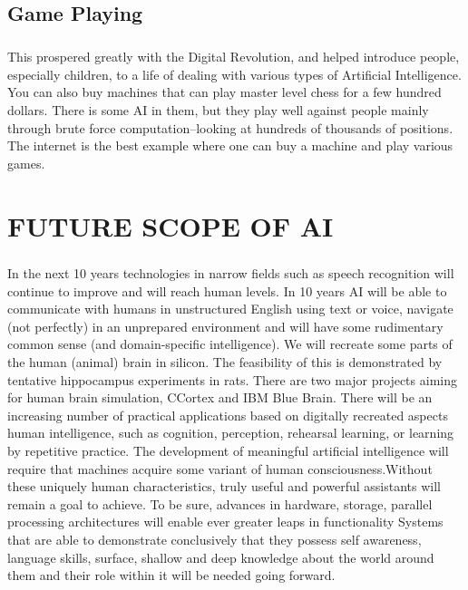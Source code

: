 \documentclass[12pt]{report}
\begin{document}
\section{Game Playing}
\paragraph{} This prospered greatly with the Digital Revolution, and helped introduce people,
especially children, to a life of dealing with various types of Artificial Intelligence. You can also buy
machines that can play master level chess for a few hundred dollars. There is some AI in them, but
they play well against people mainly through brute force computation–looking at hundreds of
thousands of positions. The internet is the best example where one can buy a machine and play
various games.
\newpage
\chapter{FUTURE SCOPE OF AI}
\paragraph{}
In the next 10 years technologies in narrow fields such as speech recognition will continue to improve
and will reach human levels. In 10 years AI will be able to communicate with humans in unstructured
English using text or voice, navigate (not perfectly) in an unprepared environment and will have some
rudimentary common sense (and domain-specific intelligence). We will recreate some parts of the
human (animal) brain in silicon. The feasibility of this is demonstrated by tentative hippocampus
experiments in rats. There are two major projects aiming for human brain simulation, CCortex and
IBM Blue Brain. There will be an increasing number of practical applications based on digitally
recreated aspects human intelligence, such as cognition, perception, rehearsal learning, or learning by
repetitive practice. The development of meaningful artificial intelligence will require that machines
acquire some variant of human consciousness.Without these uniquely human characteristics, truly
useful and powerful assistants will remain a goal to achieve. To be sure, advances in hardware,
storage, parallel processing architectures will enable ever greater leaps in functionality Systems that
are able to demonstrate conclusively that they possess self awareness, language skills, surface,
shallow and deep knowledge about the world around them and their role within it will be needed
going forward.
\end{document}
